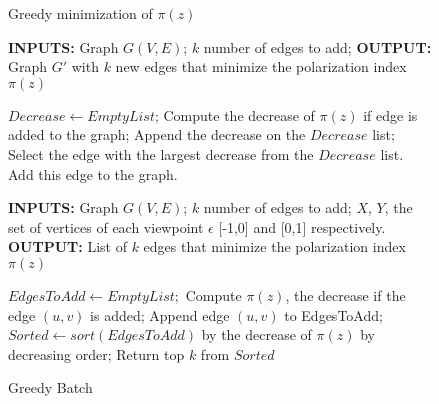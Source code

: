 \begin{figure}
 	\begin{minipage}[b]{1\linewidth}
    		\begin{algorithm}[H]
		
			\caption{Greedy minimization of $\pi(z)$}
			\label{alg:greedyAlgo}
			
			\begin{flushleft}
        				\textbf{INPUTS:} Graph $G(V, E)$; $k$ number of edges to add;
				\vspace{6pt}
        				\textbf{OUTPUT:} Graph $G'$ with $k$ new edges that minimize the polarization index $\pi(z)$
			\end{flushleft}
			
			\begin{algorithmic}[1]
				\FOR {$i = 1:k \ $}
					\STATE$Decrease \leftarrow Empty List$;
					\FOR { each  edge in $|V| \times |V| \textbackslash E$}
						\STATE Compute the decrease of $\pi(z)$ if edge is added to the graph;
						\STATE Append the decrease on the $Decrease$ list;
					\ENDFOR
					\STATE Select the edge with the largest decrease from the $Decrease$ list.
					\STATE Add this edge to the graph.
				\ENDFOR
			\end{algorithmic}
			
		\end{algorithm}
		\bigskip
  	\end{minipage}
  	\begin{minipage}[b]{1\linewidth}
     		\begin{algorithm}[H]
		
			\caption{Greedy Batch}
			\label{alg:greedyBatch}
			
			\begin{flushleft}
        				\textbf{INPUTS:} Graph $G(V, E)$; $k$ number of edges to add;
				$X$, $Y $, the set of vertices of each viewpoint $\epsilon$ [-1,0] and [0,1] respectively.\\
				\vspace{6pt}
        				\textbf{OUTPUT:} List of $k$ edges that minimize the polarization index $\pi(z)$
			\end{flushleft}
			
			\begin{algorithmic}[1]
				\STATE $EdgesToAdd \leftarrow Empty List;$
					\STATE Compute $\pi(z)$, the decrease if the edge $(u,v)$ is added;
					\STATE Append edge $(u,v)$ to EdgesToAdd;
				\ENDFOR
				\STATE $Sorted \leftarrow sort(EdgesToAdd)$ by the decrease of $\pi(z)$ by decreasing order;
				\STATE Return top $k$ from $Sorted$
			\end{algorithmic}
			
		\end{algorithm}
	\end{minipage}%
\end{figure}

